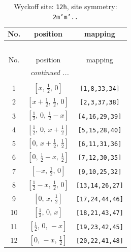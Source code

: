 \documentclass[fleqn,8pt]{jsarticle}
\begin{document}
\begin{longtable}{ccc}
\caption{Wyckoff site: {\tt 12h}, site symmetry: {\tt 2m'm'..}}
 \\
 \hline \hline
No. & position & mapping \\ \hline \endfirsthead

\multicolumn{2}{l}{\tablename\ \thetable{}} \\
 \hline \hline
No. & position & mapping \\ \hline \endhead

 \hline \hline
\multicolumn{2}{r}{\footnotesize\it continued ...} \\ \endfoot

 \hline \hline
\multicolumn{2}{r}{} \\ \endlastfoot

1 & $\left[ x,\, \frac{1}{2},\, 0 \right]$ & {\tt [1,8,33,34]} \\ \hline
2 & $\left[ x + \frac{1}{2},\, \frac{1}{2},\, 0 \right]$ & {\tt [2,3,37,38]} \\ \hline
3 & $\left[ \frac{1}{2},\, 0,\, \frac{1}{2} - x \right]$ & {\tt [4,16,29,39]} \\ \hline
4 & $\left[ \frac{1}{2},\, 0,\, x + \frac{1}{2} \right]$ & {\tt [5,15,28,40]} \\ \hline
5 & $\left[ 0,\, x + \frac{1}{2},\, \frac{1}{2} \right]$ & {\tt [6,11,31,36]} \\ \hline
6 & $\left[ 0,\, \frac{1}{2} - x,\, \frac{1}{2} \right]$ & {\tt [7,12,30,35]} \\ \hline
7 & $\left[ - x,\, \frac{1}{2},\, 0 \right]$ & {\tt [9,10,25,32]} \\ \hline
8 & $\left[ \frac{1}{2} - x,\, \frac{1}{2},\, 0 \right]$ & {\tt [13,14,26,27]} \\ \hline
9 & $\left[ 0,\, x,\, \frac{1}{2} \right]$ & {\tt [17,24,44,46]} \\ \hline
10 & $\left[ \frac{1}{2},\, 0,\, x \right]$ & {\tt [18,21,43,47]} \\ \hline
11 & $\left[ \frac{1}{2},\, 0,\, - x \right]$ & {\tt [19,23,42,45]} \\ \hline
12 & $\left[ 0,\, - x,\, \frac{1}{2} \right]$ & {\tt [20,22,41,48]} \\
\end{longtable}
\renewcommand{\arraystretch}{1.2}
\end{document}
